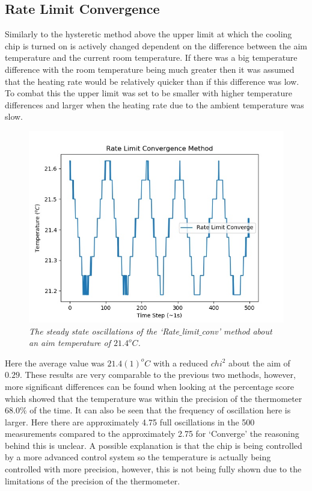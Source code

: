 \documentclass[10pt]{article}
\begin{document}
\subsection*{Rate Limit Convergence}
Similarly to the hysteretic method above the upper limit at which the cooling chip is turned on is actively changed dependent on the difference between the aim temperature and the current room temperature. If there was a big temperature difference with the room temperature being much greater then it was assumed that the heating rate would be relatively quicker than if this difference was low. To combat this the upper limit was set to be smaller with higher temperature differences and larger when the heating rate due to the ambient temperature was slow.\\

\begin{figure}[t]
    \centering
    \includegraphics[scale=0.75]{rate_lim.jpg}
    \caption{\it{The steady state oscillations of the `Rate$\_$limit$\_$conv' method about an aim temperature of $21.4^oC$.}}
    \label{fig:rate}
\end{figure}

Here the average value was $21.4(1)^oC$ with a reduced $chi^2$ about the aim of $0.29$. These results are very comparable to the previous two methods, however, more significant differences can be found when looking at the percentage score which showed that the temperature was within the precision of the thermometer $68.0\%$ of the time. It can also be seen that the frequency of oscillation here is larger. Here there are approximately 4.75 full oscillations in the 500 measurements compared to the approximately 2.75 for `Converge' the reasoning behind this is unclear. A possible explanation is that the chip is being controlled by a more advanced control system so the temperature is actually being controlled with more precision, however, this is not being fully shown due to the limitations of the precision of the thermometer.\\
\newpage
\end{document}
